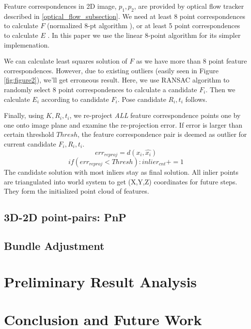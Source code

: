 \documentclass[10pt,twocolumn,letterpaper]{article}
\begin{document}
Feature correspondences in 2D image, $p_1, p_2$, are provided by optical flow tracker described in \ref{optical_flow_subsection}. We need at least 8 point correspondences to calculate $F$ (normalized 8-pt algorithm \cite{Hartley2004}), or at least 5 point correspondences to calculate $E$ \cite{Nister:2004:ESF:987526.987623}. In this paper we use the linear 8-point algorithm for its simpler implemenation.

We can calculate least squares solution of $F$ as we have more than 8 point feature  correspondences. However, due to existing outliers (easily seen in Figure \ref{fig:figure2}), we'll get erroneous result. Here, we use RANSAC \cite{Fischler:1981:RSC:358669.358692} algorithm to randomly select 8 point correspondences to calculate a candidate $F_i$. Then we calculate $E_i$ according to candidate $F_i$. Pose candidate $R_i, t_i$ follows. 

Finally, using $K, R_i, t_i$, we re-project \emph{ALL} feature correspondence points one by one onto image plane and examine the re-projection error. If error is larger than certain threshold $Thresh$, the feature correspondence pair is deemed as outlier for current candidate $F_i, R_i, t_i$. 
\begin{equation} \label{eq:3}
{err}_{reproj} = d(x_i, \hat{x_i})
\end{equation}
\begin{equation} \label{eq:3}
if ({err}_{reproj} < Thresh):
    {inlier}_{cnt} += 1
\end{equation}
The candidate solution with most inliers stay as final solution. All inlier points are triangulated into world system to get (X,Y,Z) coordinates for future steps. They form the initialized point cloud of features. 


\subsection{3D-2D point-pairs: PnP}


\subsection{Bundle Adjustment}



\section{Preliminary Result Analysis}


\section{Conclusion and Future Work}


{\small


}
\end{document}
